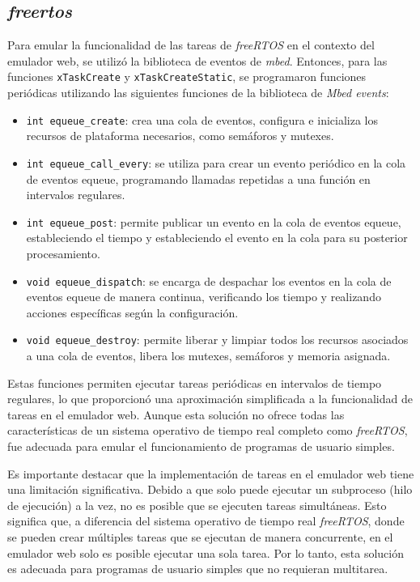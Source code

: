 \subsection{\textit{\textbf{freertos}}}

Para emular la funcionalidad de las tareas de \textit{freeRTOS} en el contexto del emulador web, se utilizó la biblioteca de eventos de \textit{mbed}. Entonces, para las funciones \texttt{xTaskCreate} y \texttt{xTaskCreateStatic}, se programaron funciones periódicas utilizando las siguientes funciones de la biblioteca de \textit{Mbed events}: 

 
 \begin{itemize}
	\item \texttt{int equeue\_create}:  crea una cola de eventos, configura e inicializa los recursos de plataforma necesarios, como semáforos y mutexes.
	
	\item \texttt{int equeue\_call\_every}:  se utiliza para crear un evento periódico en la cola de eventos equeue, programando llamadas repetidas a una función en intervalos regulares.
	
	\item \texttt{int equeue\_post}: permite publicar un evento en la cola de eventos equeue, estableciendo el tiempo y estableciendo el evento en la cola para su posterior procesamiento.
	
	\item \texttt{void equeue\_dispatch}: se encarga de despachar los eventos en la cola de eventos equeue de manera continua, verificando los tiempo y realizando acciones específicas según la configuración.

	\item \texttt{void equeue\_destroy}: permite liberar y limpiar todos los recursos asociados a una cola de eventos, libera los mutexes, semáforos y memoria asignada.
\end{itemize}

Estas funciones permiten ejecutar tareas periódicas en intervalos de tiempo regulares, lo que proporcionó una aproximación simplificada a la funcionalidad de tareas en el emulador web. Aunque esta solución no ofrece todas las características de un sistema operativo de tiempo real completo como \textit{freeRTOS}, fue adecuada para emular el funcionamiento de programas de usuario simples.

Es importante destacar que la implementación de tareas en el emulador web tiene una limitación significativa. Debido a que solo puede ejecutar un subproceso (hilo de ejecución) a la vez, no es posible que se ejecuten tareas simultáneas. Esto significa que, a diferencia del sistema operativo de tiempo real \textit{freeRTOS}, donde se pueden crear múltiples tareas que se ejecutan de manera concurrente, en el emulador web solo es posible ejecutar una sola tarea. Por lo tanto, esta solución es adecuada para programas de usuario simples que no requieran multitarea.


